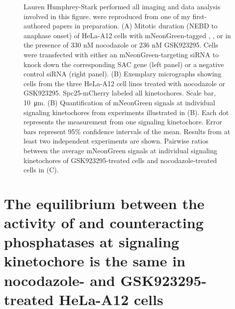\begin{figure}
    \noindent\justifying Lauren Humphrey-Stark performed all imaging and data analysis involved in this figure.  were reproduced from one of my first-authored papers in preparation. (A) Mitotic duration (NEBD to anaphase onset) of HeLa-A12 cells with  mNeonGreen-tagged , , or  in the presence of 330 nM nocodazole or 236 nM GSK923295. Cells were transfected with either an mNeonGreen-targeting siRNA to knock down the corresponding SAC gene (left panel) or a negative control siRNA (right panel). (B) Exemplary micrographs showing cells from the three HeLa-A12 cell lines treated with nocodazole or GSK923295. Spc25-mCherry labeled all kinetochores. Scale bar, \SI{10}{\micro m}. (B) Quantification of mNeonGreen signals at individual signaling kinetochores from experiments illustrated in (B). Each dot represents the measurement from one signaling kinetochore. Error bars represent 95\% confidence intervals of the mean. Results from at least two independent experiments are shown. Pairwise ratios between the average mNeonGreen signals at individual signaling kinetochores of GSK923295-treated cells and nocodazole-treated cells in (C).
    
\label{SACProteinKinetochoreRecruitment}
\end{figure}



\section{The equilibrium between the activity of  and counteracting phosphatases at signaling kinetochore is the same in nocodazole- and GSK923295-treated HeLa-A12 cells}

